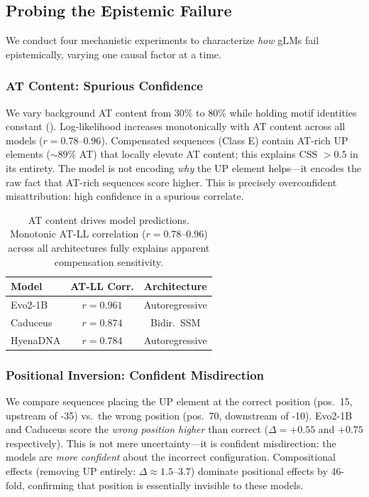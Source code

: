\documentclass{article}
\begin{document}
\subsection{Probing the Epistemic Failure}

We conduct four mechanistic experiments to characterize \emph{how} gLMs
fail epistemically, varying one causal factor at a time.

\subsubsection{AT Content: Spurious Confidence}

We vary background AT content from 30\% to 80\% while holding motif
identities constant ().
Log-likelihood increases monotonically with AT content across all models
($r = 0.78$--$0.96$).
Compensated sequences (Class E) contain AT-rich UP elements
(${\sim}89\%$ AT) that locally elevate AT content;
this explains CSS $> 0.5$ in its entirety.
The model is not encoding \emph{why} the UP element helps---it encodes the
raw fact that AT-rich sequences score higher.
This is precisely overconfident misattribution: high confidence in a
spurious correlate.

\begin{table}[t]
\caption{AT content drives model predictions. Monotonic AT-LL
         correlation ($r{=}0.78$--$0.96$) across all architectures
         fully explains apparent compensation sensitivity.}
\label{tab:at_titration}
\vskip 0.05in
\centering
\small
\begin{tabular}{@{}lcc@{}}
\toprule
Model     & AT-LL Corr.   & Architecture \\
\midrule
Evo2-1B   & $r = 0.961$   & Autoregressive \\
Caduceus  & $r = 0.874$   & Bidir.\ SSM \\
HyenaDNA  & $r = 0.784$   & Autoregressive \\
\bottomrule
\end{tabular}
\vskip -0.05in
\end{table}

\subsubsection{Positional Inversion: Confident Misdirection}

We compare sequences placing the UP element at the correct position
(pos.\ 15, upstream of -35) vs.\ the wrong position (pos.\ 70, downstream
of -10).
Evo2-1B and Caduceus score the \emph{wrong position higher} than correct
($\Delta = {+}0.55$ and ${+}0.75$ respectively).
This is not mere uncertainty---it is confident misdirection: the models
are \emph{more confident} about the incorrect configuration.
Compositional effects (removing UP entirely: $\Delta \approx 1.5$--$3.7$)
dominate positional effects by 46-fold, confirming that position is
essentially invisible to these models.
\end{document}
